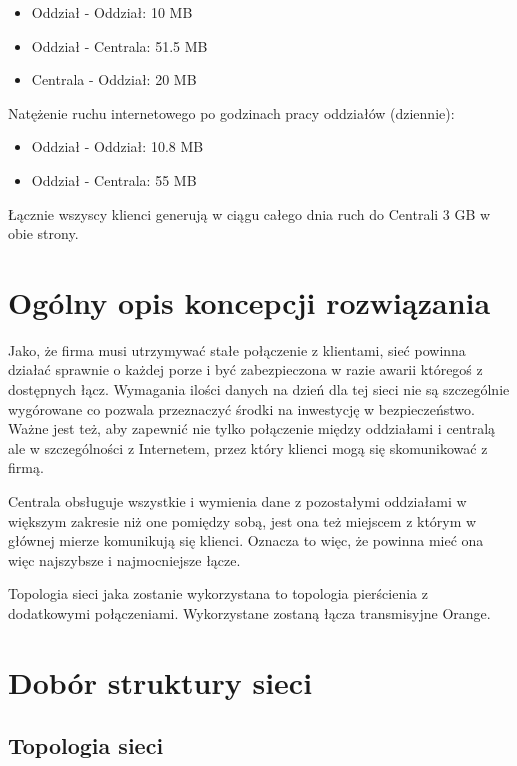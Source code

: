 \documentclass[a4paper]{article}
\begin{document}
\begin{itemize}
	\item Oddział - Oddział: 10 MB
	\item Oddział - Centrala: 51.5 MB
	\item Centrala - Oddział: 20 MB
\end{itemize}

Natężenie ruchu internetowego po godzinach pracy oddziałów (dziennie):

\begin{itemize}
	\item Oddział - Oddział: 10.8 MB
	\item Oddział - Centrala: 55 MB
\end{itemize}

Łącznie wszyscy klienci generują w ciągu całego dnia ruch do Centrali 3 GB w obie strony.

\section{Ogólny opis koncepcji rozwiązania}

Jako, że firma musi utrzymywać stałe połączenie z klientami, sieć powinna działać sprawnie o każdej porze i być zabezpieczona w razie awarii któregoś z dostępnych łącz. Wymagania ilości danych na dzień dla tej sieci nie są szczególnie wygórowane co pozwala przeznaczyć środki na inwestycję w bezpieczeństwo. Ważne jest też, aby zapewnić nie tylko połączenie między oddziałami i centralą ale w szczególności z Internetem, przez który klienci mogą się skomunikować z firmą.

Centrala obsługuje wszystkie i wymienia dane z pozostałymi oddziałami w większym zakresie niż one pomiędzy sobą, jest ona też miejscem z którym w głównej mierze komunikują się klienci. Oznacza to więc, że powinna mieć ona więc najszybsze i najmocniejsze łącze.

Topologia sieci jaka zostanie wykorzystana to topologia pierścienia z dodatkowymi połączeniami. Wykorzystane zostaną łącza transmisyjne Orange.

\section{Dobór struktury sieci}

\subsection{Topologia sieci}
\end{document}
